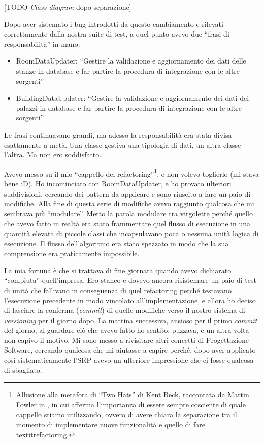 \documentclass[12pt]{report}
\begin{document}
[TODO \textit{Class diagram} dopo separazione]

Dopo aver sistemato i bug introdotti da questo cambiamento e rilevati 
correttamente dalla nostra suite di test, a quel punto avevo due 
``frasi di responsabilità'' in mano:

\begin{itemize}
  \item RoomDataUpdater: ``Gestire la validazione e aggiornamento dei dati delle
  stanze in database e far partire la procedura di integrazione
con le altre sorgenti''
  \item BuildingDataUpdater: ``Gestire la validazione e aggiornamento dei dati 
  dei palazzi in database e far partire la procedura di integrazione
con le altre sorgenti''
\end{itemize}

Le frasi continuavano grandi, ma adesso la responsabilità era stata divisa
esattamente a metà. Una classe gestiva una tipologia di dati, un 
altra classe l'altra. Ma non ero soddisfatto. 

Avevo messo su il mio ``cappello del refactoring''\footnote{
Allusione alla metafora di ``Two Hats'' di Kent Beck, raccontata
da Martin Fowler in \cite{fowler2002}, in cui afferma l'importanza di
essere sempre cosciente di quale cappello stiamo utilizzando, ovvero 
di avere chiara la separazione tra il momento di implementare nuove 
funzionalità e quello di fare textit{refactoring}.
}, e non volevo toglierlo (mi stava bene :D). 
Ho incominciato con RoomDataUpdater,
e ho provato ulteriori suddivisioni, cercando dei pattern 
da applicare e sono riuscito a fare un paio di modifiche. Alla fine di questa
serie di modifiche avevo raggiunto qualcosa che mi sembrava più ``modulare''.
Metto la parola modulare tra virgolette perché quello che avevo fatto in realtà
era stato frammentare quel flusso di esecuzione in una quantità elevata di
piccole classi che incapsulavano poca o nessuna unità logica di 
esecuzione. Il flusso dell'algoritmo era stato spezzato in modo che la sua
comprensione era praticamente impossibile.

La mia fortuna è che si trattava di fine giornata quando avevo dichiarato 
``compiuta'' quell'impresa. Ero stanco e dovevo ancora risistemare un paio
di test di unità che fallivano in conseguenza di quel refactoring perché
testavano l'esecuzione precedente in modo vincolato all'implementazione, e
allora ho deciso di lasciare la conferma (\textit{commit}) 
di quelle modifiche verso il nostro sistema di \textit{versioning}
per il giorno dopo.
La mattina successiva, ansioso per il primo \textit{commit} del giorno,
al guardare ciò che avevo fatto ho sentito: puzzava, e un altra volta non
capivo il motivo.
Mi sono messo a rivisitare altri concetti di Progettazione 
Software, cercando qualcosa che mi
aiutasse a capire perché, dopo aver applicato così sistematicamente l'SRP
avevo un ulteriore impressione che ci fosse qualcosa di sbagliato.
\end{document}
